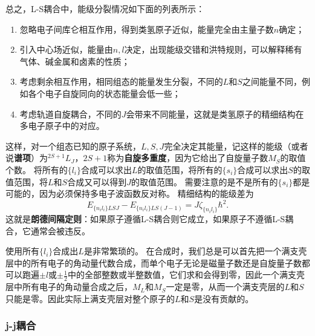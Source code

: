 \documentclass[UTF8, a4paper]{ctexart}
\begin{document}
总之，L-S耦合中，能级分裂情况如下面的列表所示：
\begin{enumerate}
    \item 忽略电子间库仑相互作用，得到类氢原子近似，能量完全由主量子数$n$确定；
    \item 引入中心场近似，能量由$n, l$决定，出现能级交错和洪特规则，可以解释稀有气体、碱金属和卤素的性质；
    \item 考虑剩余相互作用，相同组态的能量发生分裂，不同的$L$和$S$之间能量不同，例如各个电子自旋同向的状态能量会低一些；
    \item 考虑轨道自旋耦合，不同的$J$会带来不同能量，这就是类氢原子的精细结构在多电子原子中的对应。
\end{enumerate}
这样，对一个组态已知的原子系统，$L, S, J$完全决定其能量，记这样的能级（或者说\textbf{谱项}）为$^{2S+1} L_J$，$2S+1$称为\textbf{自旋多重度}，因为它给出了自旋量子数$M_S$的取值个数。
将所有的$\{l_i\}$合成可以求出$L$的取值范围，将所有的$\{s_i\}$合成可以求出$S$的取值范围，将$L$和$S$合成又可以得到$J$的取值范围。
需要注意的是不是所有的$\{s_i\}$都是可能的，因为必须保持多电子波函数反对称。
精细结构的能级差为
\begin{equation}
    E_{\{n_i l_i\} LSJ} - E_{\{n_i l_i\} LS(J-1)} = J \zeta_{\{n_i l_i\}} \hbar^2.
    \label{eq:lande-gapping}
\end{equation}
这就是\textbf{朗德间隔定则}：如果原子遵循L-S耦合则它成立，如果原子不遵循L-S耦合，它通常会被违反。

使用所有$\{l_i\}$合成出$L$是非常繁琐的。
在合成时，我们总是可以首先把一个满支壳层中的所有电子的角动量代数合成，而单个电子无论是磁量子数还是自旋量子数都可以跑遍$\pm l$或$\pm \frac{1}{2}$中的全部整数或半整数值，它们求和会得到零，因此一个满支壳层中所有电子的角动量合成之后，$M_L$和$M_S$一定是零，从而一个满支壳层的$L$和$S$只能是零。因此实际上满支壳层对整个原子的$L$和$S$是没有贡献的。


\subsubsection{j-j耦合}
\end{document}
